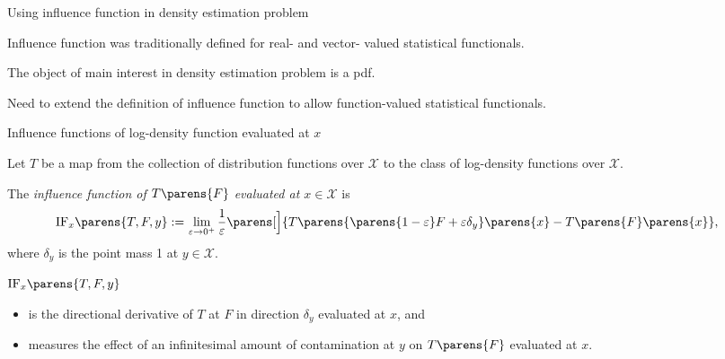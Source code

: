 \documentclass[aspectratio=169,xcolor=dvipsnames]{beamer}
\newcommand{\calX}{\mathcal{X}}
\begin{document}
\begin{frame}{Using influence function in density estimation problem}
	
	Influence function \parencite{Hampel1968-gm} was traditionally defined for {\color{red} real- and vector- valued} statistical functionals. 
	
	\vspace{5pt}
	
	The object of main interest in density estimation problem is a pdf. 
	
	\vspace{5pt}
	
	Need to extend the definition of influence function to allow {\color{red} function-valued} statistical functionals. 
	
\end{frame}


\begin{frame}{Influence functions of log-density function evaluated at $x$}

	Let $T$ be a map from the collection of distribution functions over $\calX$ to the class of log-density functions over $\calX$. 
	
	\vspace{10pt}
	
	
	The \textit{influence function of $T \parens{F}$ evaluated at $x \in \calX$} is
	\begin{align}
		\mathrm{IF}_x \parens{T, F, y} := & \, \lim_{\varepsilon \to 0^+} \frac{1}{\varepsilon} \parens[\Big]{ T \parens{ \parens{1 - \varepsilon} F + \varepsilon \delta_y } \parens{x} - T \parens{F} \parens{x} }, %
	\end{align}
	where $\delta_y$ is the point mass 1 at $y \in \calX$. 
	
	\vspace{10pt}
	
	$\mathrm{IF}_x \parens{T, F, y}$
	\begin{itemize}
		\item is the directional derivative of $T$ at $F$ in direction $\delta_y$ evaluated at $x$, and 
		\item measures the effect of an infinitesimal amount of contamination at $y$ on $T \parens{F}$ evaluated at $x$. 
	\end{itemize}
	
\end{frame}
\end{document}
